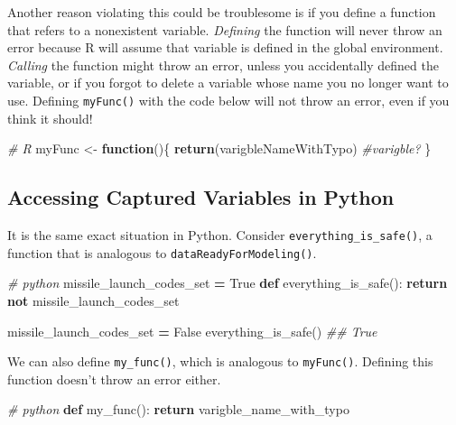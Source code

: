 \documentclass[12pt,krantz2]{krantz}
\makeatletter
\newenvironment{Shaded}{\begin{snugshade}}{\end{snugshade}}
\newcommand{\CommentTok}[1]{\textcolor[rgb]{0.37,0.37,0.37}{\textit{#1}}}
\newcommand{\ControlFlowTok}[1]{\textcolor[rgb]{0.27,0.27,0.27}{\textbf{#1}}}
\newcommand{\KeywordTok}[1]{\textcolor[rgb]{0.27,0.27,0.27}{\textbf{#1}}}
\newcommand{\NormalTok}[1]{#1}
\newcommand{\OperatorTok}[1]{\textcolor[rgb]{0.43,0.43,0.43}{\textbf{#1}}}
\newcommand{\StringTok}[1]{\textcolor[rgb]{0.5,0.5,0.5}{#1}}
\newcommand{\VariableTok}[1]{\textcolor[rgb]{0,0,0}{#1}}
\newenvironment{kframe}{%
\medskip{}
\setlength{\fboxsep}{.8em}
 \def\at@end@of@kframe{}%
 \ifinner\ifhmode%
  \def\at@end@of@kframe{\end{minipage}}%
  \begin{minipage}{\columnwidth}%
 \fi\fi%
 \def\FrameCommand##1{\hskip\@totalleftmargin \hskip-\fboxsep
 \colorbox{shadecolor}{##1}\hskip-\fboxsep
     \hskip-\linewidth \hskip-\@totalleftmargin \hskip\columnwidth}%
 \MakeFramed {\advance\hsize-\width
   \@totalleftmargin\z@ \linewidth\hsize
   \@setminipage}}%
 {\par\unskip\endMakeFramed%
 \at@end@of@kframe}
\renewenvironment{Shaded}{\begin{kframe}}{\end{kframe}}
\makeatother
\begin{document}
Another reason violating this could be troublesome is if you define a function that refers to a nonexistent variable. \emph{Defining} the function will never throw an error because R will assume that variable is defined in the global environment. \emph{Calling} the function might throw an error, unless you accidentally defined the variable, or if you forgot to delete a variable whose name you no longer want to use. Defining \texttt{myFunc()} with the code below will not throw an error, even if you think it should!

\begin{Shaded}
\begin{Highlighting}[]
\CommentTok{# R}
\NormalTok{myFunc <-}\StringTok{ }\ControlFlowTok{function}\NormalTok{()\{}
  \KeywordTok{return}\NormalTok{(varigbleNameWithTypo) }\CommentTok{#varigble?}
\NormalTok{\}}
\end{Highlighting}
\end{Shaded}

\hypertarget{accessing-captured-variables-in-python}{%
\subsection{Accessing Captured Variables in Python}\label{accessing-captured-variables-in-python}}

It is the same exact situation in Python. Consider \texttt{everything\_is\_safe()}, a function that is analogous to \texttt{dataReadyForModeling()}.

\begin{Shaded}
\begin{Highlighting}[]
\CommentTok{# python}
\NormalTok{missile_launch_codes_set }\OperatorTok{=} \VariableTok{True}
\KeywordTok{def}\NormalTok{ everything_is_safe():}
    \ControlFlowTok{return} \KeywordTok{not}\NormalTok{ missile_launch_codes_set}

\NormalTok{missile_launch_codes_set }\OperatorTok{=} \VariableTok{False}
\NormalTok{everything_is_safe()}
\CommentTok{## True}
\end{Highlighting}
\end{Shaded}

We can also define \texttt{my\_func()}, which is analogous to \texttt{myFunc()}. Defining this function doesn't throw an error either.

\begin{Shaded}
\begin{Highlighting}[]
\CommentTok{# python}
\KeywordTok{def}\NormalTok{ my_func():}
    \ControlFlowTok{return}\NormalTok{ varigble_name_with_typo}
\end{Highlighting}
\end{Shaded}
\end{document}
